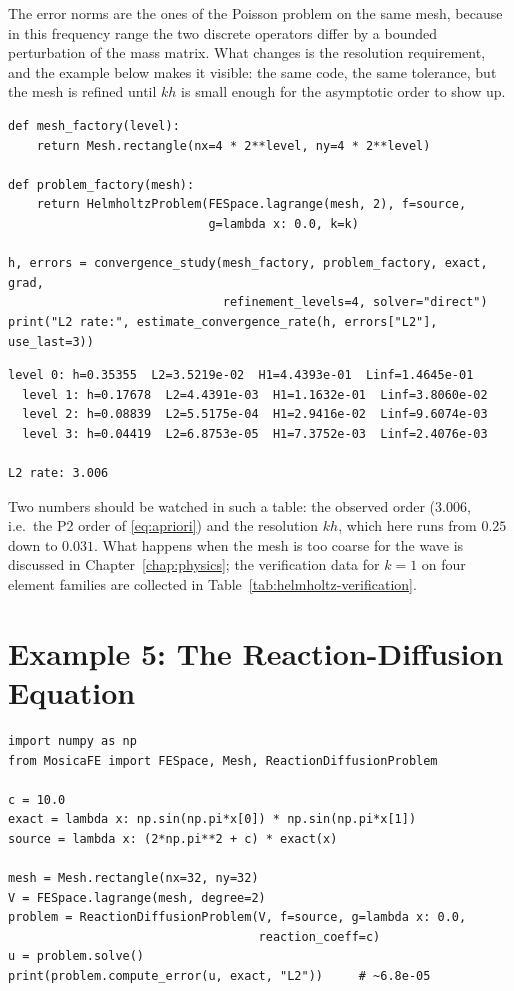 \documentclass[11pt,oneside]{book}
\theoremstyle{definition}
\theoremstyle{plain}
\begin{document}
The error norms are the ones of the Poisson problem on the same mesh, because in
this frequency range the two discrete operators differ by a bounded perturbation of
the mass matrix. What changes is the resolution requirement, and the example below
makes it visible: the same code, the same tolerance, but the mesh is refined until
$kh$ is small enough for the asymptotic order to show up.

\begin{lstlisting}[language=MosicaFE,caption={Convergence of the Helmholtz solver}]
def mesh_factory(level):
    return Mesh.rectangle(nx=4 * 2**level, ny=4 * 2**level)

def problem_factory(mesh):
    return HelmholtzProblem(FESpace.lagrange(mesh, 2), f=source,
                            g=lambda x: 0.0, k=k)

h, errors = convergence_study(mesh_factory, problem_factory, exact, grad,
                              refinement_levels=4, solver="direct")
print("L2 rate:", estimate_convergence_rate(h, errors["L2"], use_last=3))
\end{lstlisting}

\begin{lstlisting}[style=textout]
  level 0: h=0.35355  L2=3.5219e-02  H1=4.4393e-01  Linf=1.4645e-01
  level 1: h=0.17678  L2=4.4391e-03  H1=1.1632e-01  Linf=3.8060e-02
  level 2: h=0.08839  L2=5.5175e-04  H1=2.9416e-02  Linf=9.6074e-03
  level 3: h=0.04419  L2=6.8753e-05  H1=7.3752e-03  Linf=2.4076e-03

L2 rate: 3.006
\end{lstlisting}

Two numbers should be watched in such a table: the observed order ($3.006$, i.e.\
the P2 order of \eqref{eq:apriori}) and the resolution $kh$, which here runs from
$0.25$ down to $0.031$. What happens when the mesh is too coarse for the wave is
discussed in Chapter~\ref{chap:physics}; the verification data for $k=1$ on four
element families are collected in Table~\ref{tab:helmholtz-verification}.

\section{Example 5: The Reaction-Diffusion Equation}

\begin{lstlisting}[language=MosicaFE,caption={The built-in reaction-diffusion problem}]
import numpy as np
from MosicaFE import FESpace, Mesh, ReactionDiffusionProblem

c = 10.0
exact = lambda x: np.sin(np.pi*x[0]) * np.sin(np.pi*x[1])
source = lambda x: (2*np.pi**2 + c) * exact(x)

mesh = Mesh.rectangle(nx=32, ny=32)
V = FESpace.lagrange(mesh, degree=2)
problem = ReactionDiffusionProblem(V, f=source, g=lambda x: 0.0,
                                   reaction_coeff=c)
u = problem.solve()
print(problem.compute_error(u, exact, "L2"))     # ~6.8e-05
\end{lstlisting}
\end{document}
